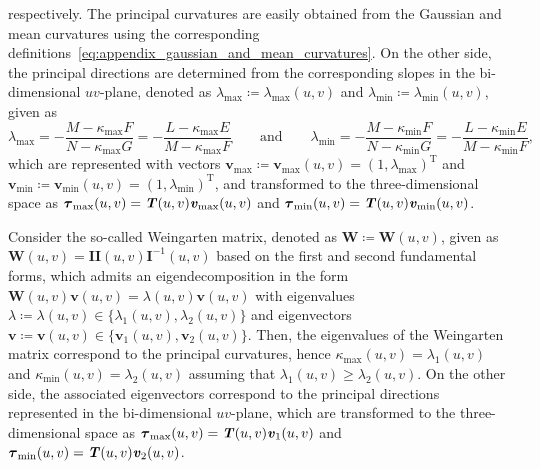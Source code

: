 respectively.
The principal curvatures are easily obtained from the Gaussian and mean curvatures using the corresponding definitions~\cref{eq:appendix_gaussian_and_mean_curvatures}.
On the other side, the principal directions are determined from the corresponding slopes in the bi-dimensional $uv$-plane, denoted as $\lambda_{\textrm{max}}\coloneqq\lambda_{\textrm{max}}\left(u,v\right)$ and $\lambda_{\textrm{min}}\coloneqq\lambda_{\textrm{min}}\left(u,v\right)$, given as
\begin{equation}
\lambda_{\textrm{max}}
=-\frac{M-\kappa_{\textrm{max}}F}{N-\kappa_{\textrm{max}}G}
=-\frac{L-\kappa_{\textrm{max}}E}{M-\kappa_{\textrm{max}}F}
\qquad
\textrm{and}
\qquad
\lambda_{\textrm{min}}
=-\frac{M-\kappa_{\textrm{min}}F}{N-\kappa_{\textrm{min}}G}
=-\frac{L-\kappa_{\textrm{min}}E}{M-\kappa_{\textrm{min}}F},
\end{equation}
which are represented with vectors $\bm{v}_{\textrm{max}}\coloneqq\bm{v}_{\textrm{max}}\left(u,v\right)=\left(1,\lambda_{\textrm{max}}\right)^{\textrm{T}}$ and $\bm{v}_{\textrm{min}}\coloneqq\bm{v}_{\textrm{min}}\left(u,v\right)=\left(1,\lambda_{\textrm{min}}\right)^{\textrm{T}}$, and transformed to the three-dimensional space as $\bs{\tau}_{\textrm{max}}\left(u,v\right)=\bm{T}\left(u,v\right)\bm{v}_{\textrm{max}}\left(u,v\right)$ and $\bs{\tau}_{\textrm{min}}\left(u,v\right)=\bm{T}\left(u,v\right)\bm{v}_{\textrm{min}}\left(u,v\right)$.

Consider the so-called Weingarten matrix, denoted as $\bm{W}\coloneqq\bm{W}\left(u,v\right)$, given as $\bm{W}\left(u,v\right)=\bm{II}\left(u,v\right)\bm{I}^{-1}\left(u,v\right)$ based on the first and second fundamental forms, which admits an eigendecomposition in the form $\bm{W}\left(u,v\right)\bm{v}\left(u,v\right)=\lambda\left(u,v\right)\bm{v}\left(u,v\right)$ with eigenvalues $\lambda\coloneqq\lambda\left(u,v\right)\in\lbrace\lambda_{1}\left(u,v\right),\lambda_{2}\left(u,v\right)\rbrace$ and eigenvectors $\bm{v}\coloneqq\bm{v}\left(u,v\right)\in\lbrace\bm{v}_{1}\left(u,v\right),\bm{v}_{2}\left(u,v\right)\rbrace$.
Then, the eigenvalues of the Weingarten matrix correspond to the principal curvatures, hence $\kappa_{\textrm{max}}\left(u,v\right)=\lambda_{1}\left(u,v\right)$ and $\kappa_{\textrm{min}}\left(u,v\right)=\lambda_{2}\left(u,v\right)$ assuming that $\lambda_{1}\left(u,v\right)\geq\lambda_{2}\left(u,v\right)$.
On the other side, the associated eigenvectors correspond to the principal directions represented in the bi-dimensional $uv$-plane, which are transformed to the three-dimensional space as $\bs{\tau}_{\textrm{max}}\left(u,v\right)=\bm{T}\left(u,v\right)\bm{v}_{1}\left(u,v\right)$ and $\bs{\tau}_{\textrm{min}}\left(u,v\right)=\bm{T}\left(u,v\right)\bm{v}_{2}\left(u,v\right)$.

